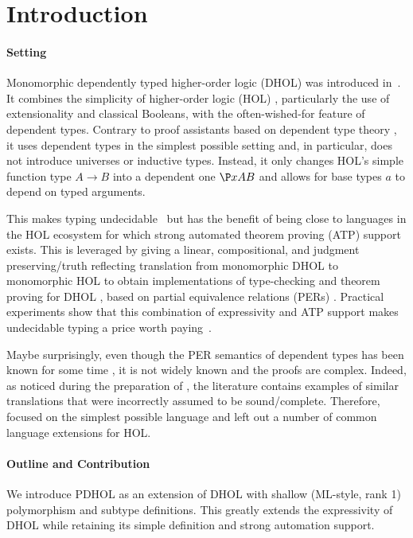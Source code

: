 \section{Introduction}
\paragraph*{Setting}
Monomorphic dependently typed higher-order logic (DHOL) was introduced in~\cite{RRB:dhol:23,RRB23ext}.
It combines the simplicity of higher-order logic (HOL) \cite{churchtypes,hol}, particularly the
use of extensionality and classical Booleans, with the often-wished-for feature of dependent types.
Contrary to proof assistants based on dependent type theory \cite{coq,agda,lean}, it uses dependent types in the simplest possible setting and, in particular, does not introduce universes or inductive types.
Instead, it only changes HOL's simple function type $A\to B$ into a dependent one $\P x A B$ and allows for base types $a$ to depend on typed arguments.

This makes typing undecidable~\cite{H97} but has the benefit of being close
to languages in the HOL ecosystem for which strong automated theorem proving
(ATP) support exists. 
This is leveraged by giving a linear, compositional,
and judgment preserving/truth reflecting translation from monomorphic DHOL to monomorphic HOL to obtain implementations of
type-checking and theorem proving for DHOL \cite{RRB23ext}, based on partial equivalence relations (PERs) \cite{persemantics}.
Practical experiments show that this combination of expressivity and ATP support makes undecidable typing a price worth paying~\cite{dhol_satallax}.

Maybe surprisingly, even though the PER semantics of dependent types has been known for some time \cite{persemantics}, it is not widely known and the proofs are complex.
Indeed, as noticed during the preparation of \cite{southern_phd}, the literature contains examples of similar translations that were incorrectly assumed to be sound/complete.
Therefore, \cite{RRB23ext} focused on the simplest possible language and left out a number of common language extensions for HOL.

\paragraph*{Outline and Contribution}
We introduce PDHOL as an extension of DHOL with shallow (ML-style, rank 1) polymorphism and subtype definitions.
This greatly extends the expressivity of DHOL while retaining its simple definition and strong automation support.

